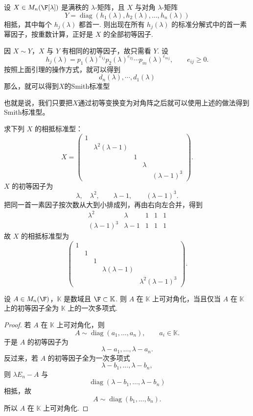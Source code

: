 	设 $X\in M_n(\F[\lambda])$ 是满秩的 $\lambda$-矩阵，且 $X$ 与对角 $\lambda$-矩阵
	\[
	Y=\operatorname{diag}(h_1(\lambda),h_2(\lambda),\ldots,h_n(\lambda))
	\]
	相抵，其中每个 $h_j(\lambda)$ 都首一. 则出现在所有 $h_j(\lambda)$ 的标准分解式中的首一素幂因子，按重数计算，正好是 $X$ 的全部初等因子.



	因 $X\sim Y$，$X$ 与 $Y$ 有相同的初等因子，故只需看 $Y$.
	设
	\[
	h_j(\lambda)=p_1(\lambda)^{e_{1j}}p_2(\lambda)^{e_{2j}}\cdots p_m(\lambda)^{e_{mj}},
	\qquad e_{ij}\geq0.
	\]
	按照上面引理的操作方式，就可以得到\[d_n(\lambda),\cdots, d_1(\lambda)\]
	那么，就可以得到$X$的Smith标准型
	
	也就是说，我们只要把$X$通过初等变换变为对角阵之后就可以使用上述的做法得到Smith标准型。
\begin{example}
	求下列 $X$ 的相抵标准型：
	\[
	X=\begin{pmatrix}
	1&&&&\\
	&\lambda^2(\lambda-1)&&&\\
	&&1&&\\
	&&&\lambda&\\
	&&&& (\lambda-1)^3
\end{pmatrix}.
\]
$X$ 的初等因子为
\[
\lambda,\quad \lambda^2,
\qquad
\lambda-1,
\qquad
(\lambda-1)^3.
\]
把同一首一素因子按次数从大到小排成列，再由右向左合并，得到
\[
\begin{array}{ccccc}
	\lambda^2&\lambda&1&1&1\\
	(\lambda-1)^3&\lambda-1&1&1&1
\end{array}
\]
故 $X$ 的相抵标准型为
\[
\begin{pmatrix}
	1&&&&\\
	&1&&&\\
	&&1&&\\
	&&&\lambda(\lambda-1)&\\
	&&&&\lambda^2(\lambda-1)^3
\end{pmatrix}.
\]
\end{example}

\begin{corollary}
设 $A\in M_n(\F)$，$\mathbb{K}$ 是数域且 $\F\subset \mathbb{K}$. 则 $A$ 在 $\mathbb{K}$ 上可对角化，当且仅当 $A$ 在 $\mathbb{K}$ 上的初等因子全为 $\mathbb{K}$ 上的一次多项式.
\end{corollary}


\begin{proof}
若 $A$ 在 $\mathbb{K}$ 上可对角化，则
\[
A\sim \operatorname{diag}(a_1,\ldots,a_n),\qquad a_i\in \mathbb{K}.
\]
于是 $A$ 的初等因子为
\[
\lambda-a_1,\ldots,\lambda-a_n.
\]
反过来，若 $A$ 的初等因子全为一次多项式
\[
\lambda-b_1,
\ldots,
\lambda-b_n,
\]
则 $\lambda E_n-A$ 与
\[
\operatorname{diag}(\lambda-b_1,
\ldots,
\lambda-b_n)
\]
相抵，故
\[
A\sim \operatorname{diag}(b_1,
\ldots,b_n).
\]
所以 $A$ 在 $\mathbb{K}$ 上可对角化.
\end{proof}

